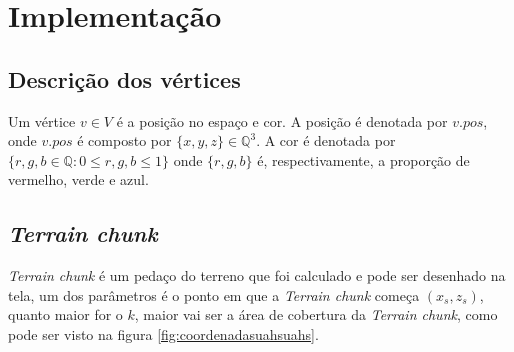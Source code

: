 

\chapter{Implementação}



\section{Descrição dos vértices}
Um vértice $v \in V$ é a posição no espaço e cor. A
posição é denotada por $v.pos$, onde $v.pos$ é composto por 
$\{x, y, z\} \in \mathbb{Q}^3$. A cor
é denotada por $\{r, g, b \in \mathbb{Q}:0 \leq r, g, b \leq 1\}$ onde $\{r, g, b\}$ é,
respectivamente, a proporção de vermelho, verde e azul.


\section{\textit{Terrain chunk}}

\textit{Terrain chunk} é um pedaço do terreno que foi calculado e pode ser desenhado
na tela, um dos parâmetros é o ponto em que a \textit{Terrain chunk} começa $(x_{s}, z_{s})$, 
quanto maior for o $k$, maior vai ser a área de cobertura da  \textit{Terrain chunk}, como pode ser visto
na figura \ref{fig:coordenadasuahsuahs}.

